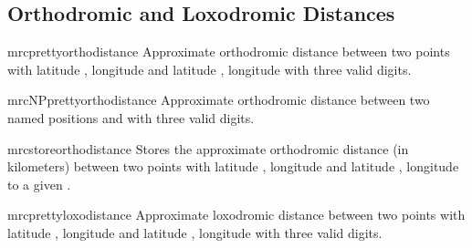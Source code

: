 \clearpage
\subsection{Orthodromic and Loxodromic Distances}

\begin{docCommand}{mrcprettyorthodistance}{}
  Approximate orthodromic distance between two points
  with latitude , longitude 
  and latitude , longitude 
  with three valid digits.
  \begin{dispExample}
  \end{dispExample}
\end{docCommand}


\begin{docCommand}{mrcNPprettyorthodistance}{}
  Approximate orthodromic distance between two named positions
   and  with three valid digits.
  \begin{dispExample}
  \end{dispExample}
\end{docCommand}


\begin{docCommand}{mrcstoreorthodistance}{}
  Stores the approximate orthodromic distance (in kilometers) between two points
  with latitude , longitude 
  and latitude , longitude 
  to a given .
  \begin{dispExample}
  \mrcstoreorthodistance{}
  \mydist
  \end{dispExample}
\end{docCommand}


\begin{docCommand}{mrcprettyloxodistance}{}
  Approximate loxodromic distance between two points
  with latitude , longitude 
  and latitude , longitude 
  with three valid digits.
  \begin{dispExample}
  \end{dispExample}
\end{docCommand}


